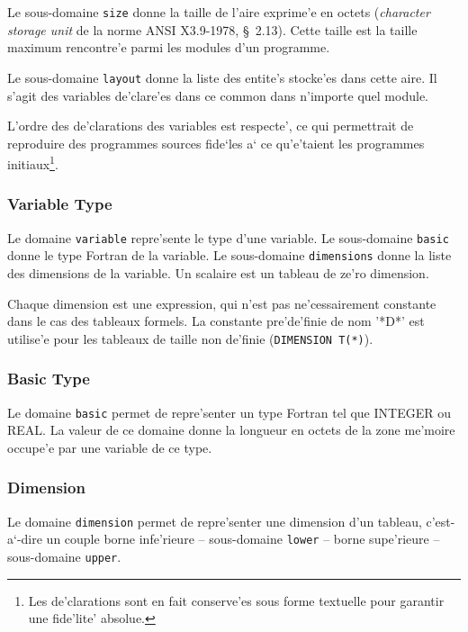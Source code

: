 Le sous-domaine {\tt size} donne la taille de l'aire
exprime'e en octets ({\em character storage unit} de la norme ANSI
X3.9-1978, \S~2.13). Cette taille est la taille maximum rencontre'e
parmi les modules d'un programme. 

Le sous-domaine {\tt layout} donne la
liste des entite's stocke'es dans cette aire. Il s'agit des variables
de'clare'es dans ce common dans n'importe quel module.

L'ordre des de'clarations des variables est respecte', ce qui
permettrait de reproduire des programmes sources fide`les a` ce
qu'e'taient les programmes initiaux\footnote{Les de'clarations sont en
fait conserve'es sous forme textuelle pour garantir une fide'lite'
absolue.}.

\subsubsection{Variable Type}
\label{subsubsection-variable}

{
Le domaine \verb/variable/ repre'sente le type d'une variable.  Le
sous-domaine \verb/basic/ donne le type Fortran de la variable.  Le
sous-domaine \verb/dimensions/ donne la liste des dimensions de la variable.
Un scalaire est un tableau de ze'ro dimension.

Chaque dimension est une expression, qui n'est pas ne'cessairement
constante dans le cas des tableaux formels. La constante pre'de'finie de
nom '*D*' est utilise'e pour les tableaux de taille non de'finie
(\verb/DIMENSION T(*)/).
}

\subsubsection{Basic Type}
\label{subsubsection-basic}

{
Le domaine \verb/basic/ permet de repre'senter un type Fortran tel que
INTEGER ou REAL. La valeur de ce domaine donne la longueur en octets de
la zone me'moire occupe'e par une variable de ce type.
}

\subsubsection{Dimension}
\label{subsubsection-dimension}

{
Le domaine \verb/dimension/ permet de repre'senter une dimension d'un
tableau, c'est-a`-dire un couple borne infe'rieure -- sous-domaine
\verb/lower/ -- borne supe'rieure -- sous-domaine \verb/upper/.
}

